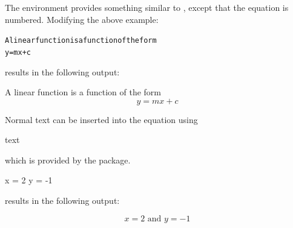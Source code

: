 The \label{env:equation} 
environment provides something similar to
 , except
that the equation is numbered.  Modifying the above example:
\begin{code}
\begin{alltt}
A linear function is a function of the form
y = mx + c
\end{alltt}
\end{code}%
results in the following output:
\begin{result}
A linear function is a function of the form
\begin{equation}
y = mx + c
\end{equation}
\end{result}
Normal text can be inserted into the equation using
\begin{definition}
\gls{text}
\end{definition}
which is provided by the  package.

\begin{codeS}
 x = 2  y = -1 
\end{codeS}%
results in the following output:
\begin{result}
\[ x = 2 \text{ and } y = -1 \]
\end{result}

